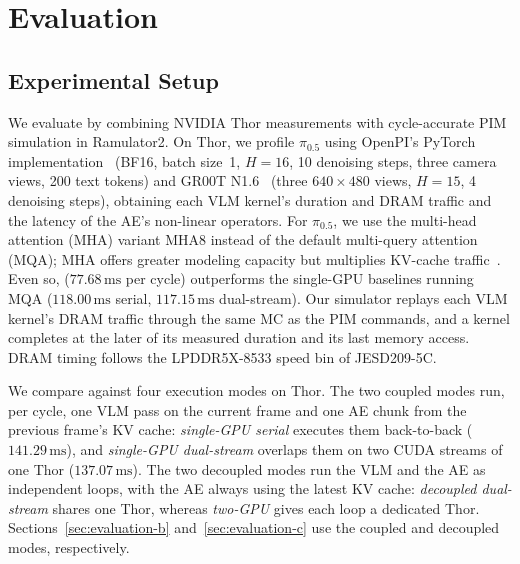 


\section{Evaluation}
\label{sec:evaluation}
\subsection{Experimental Setup}
\label{sec:evaluation-a}
We evaluate \sys{} by combining NVIDIA Thor measurements with cycle-accurate PIM simulation in Ramulator2. On Thor, we profile $\pi_{0.5}$ using OpenPI's PyTorch implementation~\cite{openpi} (BF16, batch size~1, $H=16$, 10 denoising steps, three camera views, 200 text tokens) and GR00T N1.6~\cite{gr00t_n16} (three $640\times480$ views, $H=15$, 4 denoising steps), obtaining each VLM kernel's duration and DRAM traffic and the latency of the AE's non-linear operators. For $\pi_{0.5}$, we use the multi-head attention (MHA) variant MHA8 instead of the default multi-query attention (MQA); MHA offers greater modeling capacity but multiplies KV-cache traffic~\cite{mqa}. Even so, \sys{} ($77.68\,\mathrm{ms}$ per cycle) outperforms the single-GPU baselines running MQA ($118.00\,\mathrm{ms}$ serial, $117.15\,\mathrm{ms}$ dual-stream). Our simulator replays each VLM kernel's DRAM traffic through the same MC as the PIM commands, and a kernel completes at the later of its measured duration and its last memory access. DRAM timing follows the LPDDR5X-8533 speed bin of JESD209-5C.

We compare against four execution modes on Thor. The two coupled modes run, per cycle, one VLM pass on the current frame and one AE chunk from the previous frame's KV cache: \textit{single-GPU serial} executes them back-to-back ($141.29\,\mathrm{ms}$), and \textit{single-GPU dual-stream} overlaps them on two CUDA streams of one Thor ($137.07\,\mathrm{ms}$). The two decoupled modes run the VLM and the AE as independent loops, with the AE always using the latest KV cache: \textit{decoupled dual-stream} shares one Thor, whereas \textit{two-GPU} gives each loop a dedicated Thor. Sections~\ref{sec:evaluation-b} and~\ref{sec:evaluation-c} use the coupled and decoupled modes, respectively.

